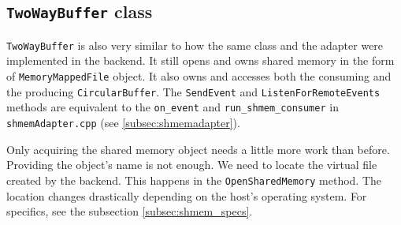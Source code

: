 \subsection{\texttt{TwoWayBuffer} class}

\texttt{TwoWayBuffer} is also very similar to how the same class and the adapter were implemented in the backend. It still opens and owns shared memory in the form of \texttt{MemoryMappedFile} object. It also owns and accesses both the consuming and the producing \texttt{CircularBuffer}. The \texttt{SendEvent} and \texttt{ListenForRemoteEvents} methods are equivalent to the \texttt{on\_event} and \texttt{run\_shmem\_consumer} in \texttt{shmemAdapter.cpp} (see \ref{subsec:shmemadapter}).

Only acquiring the shared memory object needs a little more work than before. Providing the object's name is not enough. We need to locate the virtual file created by the backend. This happens in the \texttt{OpenSharedMemory} method. The location changes drastically depending on the host's operating system. For specifics, see the subsection \ref{subsec:shmem_specs}.